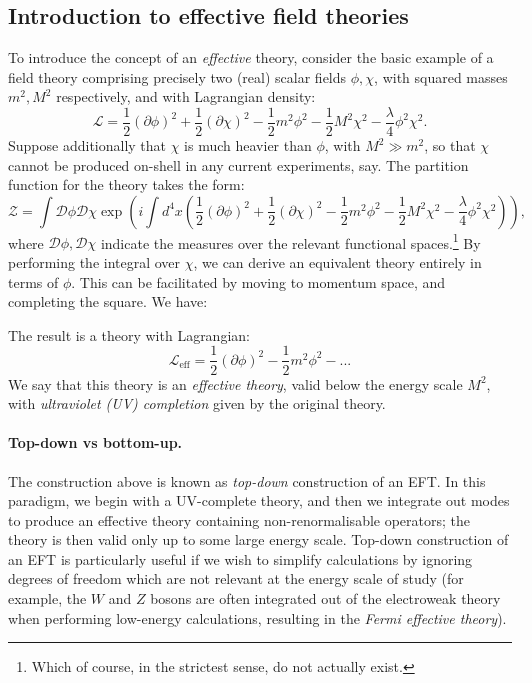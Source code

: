 \documentclass[withindex,glossary]{cam-thesis}
\begin{document}
\subsection{Introduction to effective field theories}
\label{subsec:eft_background}

To introduce the concept of an \textit{effective} theory, consider the basic example of a field theory comprising precisely two (real) scalar fields $\phi, \chi$, with squared masses $m^2, M^2$ respectively, and with Lagrangian density:
\begin{equation}
\mathcal{L} = \frac{1}{2} (\partial \phi)^2 + \frac{1}{2}(\partial \chi)^2 - \frac{1}{2} m^2 \phi^2 - \frac{1}{2} M^2 \chi^2 - \frac{\lambda}{4} \phi^2 \chi^2.
\end{equation}
Suppose additionally that $\chi$ is much heavier than $\phi$, with $M^2 \gg m^2$, so that $\chi$ cannot be produced on-shell in any current experiments, say. The partition function for the theory takes the form:
\begin{equation}
\mathcal{Z} = \int \mathcal{D}\phi \mathcal{D}\chi \exp\left(i \int d^4x \left( \frac{1}{2} (\partial \phi)^2 + \frac{1}{2}(\partial \chi)^2 - \frac{1}{2} m^2 \phi^2 - \frac{1}{2} M^2 \chi^2 - \frac{\lambda}{4} \phi^2 \chi^2\right) \right),
\end{equation}
where $\mathcal{D}\phi, \mathcal{D}\chi$ indicate the measures over the relevant functional spaces.\footnote{Which of course, in the strictest sense, do not actually exist.} By performing the integral over $\chi$, we can derive an equivalent theory entirely in terms of $\phi$. This can be facilitated by moving to momentum space, and completing the square. We have:

The result is a theory with Lagrangian:
\begin{equation}
\mathcal{L}_{\text{eff}} = \frac{1}{2} (\partial \phi)^2 - \frac{1}{2}m^2 \phi^2 - ... 
\end{equation}
We say that this theory is an \textit{effective theory}, valid below the energy scale $M^2$, with \textit{ultraviolet (UV) completion} given by the original theory.

\paragraph{Top-down vs bottom-up.} The construction above is known as \textit{top-down} construction of an EFT. In this paradigm, we begin with a UV-complete theory, and then we integrate out modes to produce an effective theory containing non-renormalisable operators; the theory is then valid only up to some large energy scale. Top-down construction of an EFT is particularly useful if we wish to simplify calculations by ignoring degrees of freedom which are not relevant at the energy scale of study (for example, the $W$ and $Z$ bosons are often integrated out of the electroweak theory when performing low-energy calculations, resulting in the \textit{Fermi effective theory}).
\end{document}
